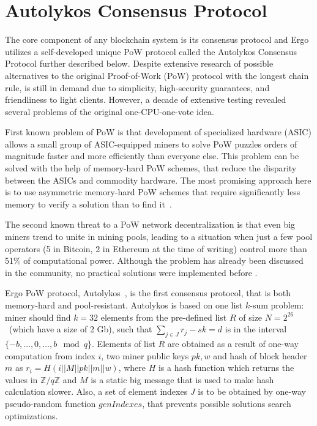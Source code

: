 \section{Autolykos Consensus Protocol}
\label{sec:autolykos}


The core component of any blockchain system is its consensus protocol and Ergo utilizes a self-developed
unique PoW protocol called the Autolykos Consensus Protocol further described below.
Despite extensive research of possible alternatives to the original Proof-of-Work (PoW) protocol
with the longest chain rule,
is still in demand due to simplicity, high-security guarantees, and friendliness to light clients.
However, a decade of extensive testing revealed several problems of the original one-CPU-one-vote idea.

First known problem of PoW is that development of specialized hardware (ASIC) allows
a small group of ASIC-equipped miners to solve PoW puzzles orders of magnitude faster and more efficiently
than everyone else. This problem can be solved with the help of memory-hard PoW schemes,
that reduce the disparity between the ASICs and commodity hardware. The most promising approach here
is to use asymmetric memory-hard PoW schemes that require significantly less memory
to verify a solution than to find it~\cite{biryukov2017equihash,ethHash}.

The second known threat to a PoW network decentralization is that even big miners trend to unite in
mining pools, leading to a situation when just a few pool operators (5 in Bitcoin, 2 in Ethereum
at the time of writing) control more than 51\% of computational power.
Although the problem has already been discussed in the community, no practical solutions were
implemented before \Ergo{}.


Ergo PoW protocol, Autolykos~\cite{Ergopow}, is the first consensus protocol, that is both memory-hard
and pool-resistant.
Autolykos is based on one list $k$-sum problem: miner should find
$k=32$ elements from the pre-defined list $R$ of size $N=2^{26}$~(which have a size of 2 Gb),
such that $\sum_{j \in J} r_{j} - sk = d$ is in the interval $\{-b,\dots,0,\dots,b\mod q\}$.
Elements of list $R$ are obtained as a result of one-way computation from index $i$,
two miner public keys $pk,w$ and hash of block header $m$ as $r_i=H(i||M||pk||m||w)$,
where $H$ is a hash function which returns the values in $\mathbb{Z}/q\mathbb{Z}$ and
$M$ is a static big message that is used to make hash calculation slower.
Also, a set of element indexes $J$ is to be obtained
by one-way pseudo-random function $genIndexes$, that prevents possible solutions
search optimizations.

